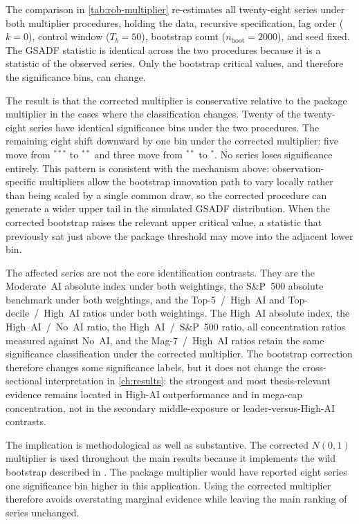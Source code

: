 The comparison in \cref{tab:rob-multiplier} re-estimates all twenty-eight series under both multiplier procedures, holding the data, recursive specification, lag order ($k=0$), control window ($T_b=50$), bootstrap count ($n_{\mathrm{boot}}=\num{2000}$), and seed fixed. The GSADF statistic is identical across the two procedures because it is a statistic of the observed series. Only the bootstrap critical values, and therefore the significance bins, can change.

The result is that the corrected multiplier is conservative relative to the package multiplier in the cases where the classification changes. Twenty of the twenty-eight series have identical significance bins under the two procedures. The remaining eight shift downward by one bin under the corrected multiplier: five move from $^{***}$ to $^{**}$ and three move from $^{**}$ to $^{*}$. No series loses significance entirely. This pattern is consistent with the mechanism above: observation-specific multipliers allow the bootstrap innovation path to vary locally rather than being scaled by a single common draw, so the corrected procedure can generate a wider upper tail in the simulated GSADF distribution. When the corrected bootstrap raises the relevant upper critical value, a statistic that previously sat just above the package threshold may move into the adjacent lower bin.

The affected series are not the core identification contrasts. They are the Moderate~AI absolute index under both weightings, the S\&P~500 absolute benchmark under both weightings, and the Top-5~/~High~AI and Top-decile~/~High~AI ratios under both weightings. The High~AI absolute index, the High~AI~/~No~AI ratio, the High~AI~/~S\&P~500 ratio, all concentration ratios measured against No~AI, and the Mag-7~/~High~AI ratios retain the same significance classification under the corrected multiplier. The bootstrap correction therefore changes some significance labels, but it does not change the cross-sectional interpretation in \cref{ch:results}: the strongest and most thesis-relevant evidence remains located in High-AI outperformance and in mega-cap concentration, not in the secondary middle-exposure or leader-versus-High-AI contrasts.

The implication is methodological as well as substantive. The corrected $N(0,1)$ multiplier is used throughout the main results because it implements the wild bootstrap described in \citet{harveyEtAl2016}. The package multiplier would have reported eight series one significance bin higher in this application. Using the corrected multiplier therefore avoids overstating marginal evidence while leaving the main ranking of series unchanged.


